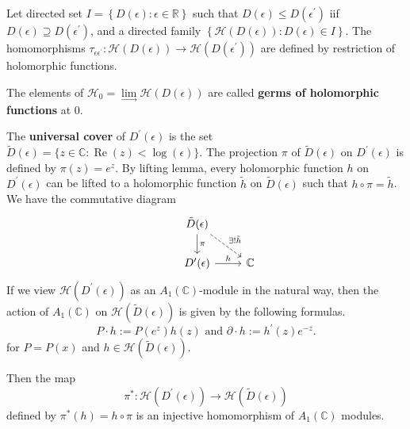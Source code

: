 \documentclass[12pt, oneside]{book}
\begin{document}
\begin{proposition}
    Let directed set $I=\left\{D(\epsilon): \epsilon \in \mathbb{R}\right\}$ such that $D(\epsilon) \leq D(\epsilon^\prime)$ iif $D(\epsilon) \supseteq D(\epsilon^\prime)$, and a directed family $\left\{\mathcal{H}(D\left(\epsilon\right)): D(\epsilon) \in I \right\}$.
    The homomorphisms $\tau_{\epsilon \epsilon^{\prime}}: \mathcal{H}(D(\epsilon)) \longrightarrow \mathcal{H}\left(D\left(\epsilon^{\prime}\right)\right)$ are defined by restriction of holomorphic functions.

    The elements of $\mathcal{H}_0=\lim\limits_{\longrightarrow} \mathcal{H}(D(\epsilon))$ are called \textbf{germs of holomorphic functions} at $0$.
\end{proposition}
The \textbf{universal cover} of $D^{\prime}(\epsilon)$ is the set $\tilde{D}(\epsilon)=\{z \in \mathbb{C}: \operatorname{Re}(z)<\log (\epsilon)\}$. The projection $\pi$ of $\tilde{D}(\epsilon)$ on $D^{\prime}(\epsilon)$ is defined by $\pi(z)=e^z$.
By lifting lemma, every holomorphic function $h$ on $D^{\prime}(\epsilon)$ can be lifted to a holomorphic function $\tilde{h}$ on $\tilde{D}(\epsilon)$ such that $h \circ \pi=\tilde{h}$.
We have the commutative diagram
\begin{equation*}
    \begin{tikzcd}
        & \tilde{D}(\epsilon) \arrow[d,"\pi"] \arrow[rd,dashed,"\exists!\tilde{h}"]& \\
        & D^{\prime}(\epsilon) \arrow[r,"h"]  & \mathbb{C}
    \end{tikzcd}
\end{equation*}
If we view $\mathcal{H}(D^\prime(\epsilon))$ as an $A_1(\mathbb{C})$-module in the natural way,
then the action of $A_1(\mathbb{C})$ on $\mathcal{H}(\tilde{D}(\epsilon))$ is given by the following formulas.
\begin{equation*}
    P \cdot h:=P\left(e^z\right) h(z) \text { and } \partial \cdot h:=h^{\prime}(z) e^{-z} .
\end{equation*}
for $P=P(x)$ and $h \in \mathcal{H}(\tilde{D}(\epsilon))$.

\begin{proposition}
    Then the map
    \begin{equation*}
        \pi^*: \mathcal{H}\left(D^{\prime}(\epsilon)\right) \longrightarrow \mathcal{H}(\tilde{D}(\epsilon))
    \end{equation*}
    defined by $\pi^*(h)=h\circ \pi$ is an injective homomorphism of $A_1(\mathbb{C})$ modules.
\end{proposition}
\end{document}
